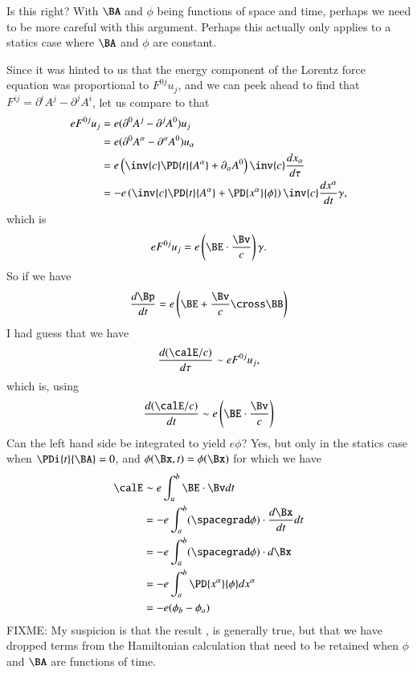 {Is this right?  With \(\BA\) and \(\phi\) being functions of space and time, perhaps we need to be more careful with this argument.  Perhaps this actually only applies to a statics case where \(\BA\) and \(\phi\) are constant.

Since it was hinted to us that the energy component of the Lorentz force equation was proportional to \(F^{0j} u_j\), and we can peek ahead to find that \(F^{ij} = \partial^i A^j - \partial^j A^i\), let us compare to that
%
\begin{equation}\label{eqn:relativisticElectrodynamicsT3:1090}
\begin{aligned}
e F^{0 j} u_j
&=
e (\partial^0 A^j - \partial^j A^0) u_j \\
&=
e (\partial^0 A^\alpha - \partial^\alpha A^0) u_\alpha \\
&=
e \left( \inv{c} \PD{t}{A^\alpha} + \partial_\alpha A^0 \right) \inv{c} \frac{dx_\alpha}{d\tau} \\
&=
-e \left( \inv{c} \PD{t}{A^\alpha} + \PD{x^\alpha}{\phi} \right) \inv{c} \frac{dx^\alpha}{dt} \gamma,
\end{aligned}
\end{equation}
%
which is
%
\begin{equation}\label{eqn:relativisticElectrodynamicsT3:910}
e F^{0 j} u_j = e \left(\BE \cdot \frac{\Bv}{c}\right) \gamma.
\end{equation}
%
So if we have
%
\begin{equation}\label{eqn:relativisticElectrodynamicsT3:920}
\frac{d\Bp}{dt} = e \left( \BE + \frac{\Bv}{c} \cross \BB \right)
\end{equation}
%
I had guess that we have
%
\begin{equation}\label{eqn:relativisticElectrodynamicsT3:940}
\frac{d(\calE/c)}{d\tau} \sim e F^{0 j} u_j,
\end{equation}
%
which is, using 
%
\begin{equation}\label{eqn:relativisticElectrodynamicsT3:950}
\frac{d(\calE/c)}{dt} \sim e \left(\BE \cdot \frac{\Bv}{c}\right)
\end{equation}
%
Can the left hand side be integrated to yield \(e \phi\)?  Yes, but only in the statics case when \(\PDi{t}{\BA} = 0\), and \(\phi(\Bx,t) = \phi(\Bx)\) for which we have
%
\begin{equation}\label{eqn:relativisticElectrodynamicsT3:1110}
\begin{aligned}
\calE
&\sim e \int_a^b \BE \cdot \Bv dt \\
&= -e \int_a^b (\spacegrad \phi) \cdot \frac{d \Bx}{dt} dt \\
&= -e \int_a^b (\spacegrad \phi) \cdot d \Bx \\
&= -e \int_a^b \PD{x^\alpha}{\phi} d x^\alpha \\
&= -e (\phi_b - \phi_a)
\end{aligned}
\end{equation}
%
FIXME: My suspicion is that the result , is generally true, but that we have dropped terms from the Hamiltonian calculation that need to be retained when \(\phi\) and \(\BA\) are functions of time.
%
}
